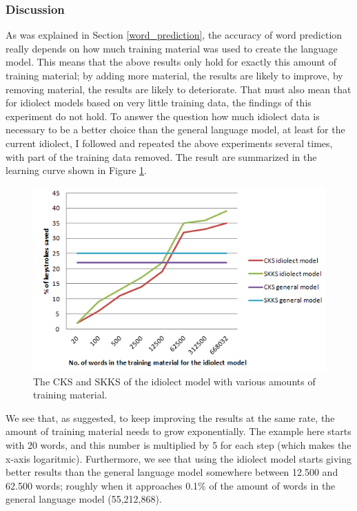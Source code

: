 \documentclass[11pt]{article}
\begin{document}
\subsubsection{Discussion}
As was explained in Section \ref{word_prediction}, the accuracy of word prediction really depends on how much training material was used to create the language model. This means that the above results only hold for exactly this amount of training material; by adding more material, the results are likely to improve, by removing material, the results are likely to deteriorate. That must also mean that for idiolect models based on very little training data, the findings of this experiment do not hold. To answer the question how much idiolect data is necessary to be a better choice than the general language model, at least for the current idiolect, I followed  and repeated the above experiments several times, with part of the training data removed. The result are summarized in the learning curve shown in Figure \ref{lcurve}.

\begin{figure}[H] \centering
\includegraphics[scale=1]{lcurve}
\caption{The CKS and SKKS of the idiolect model with various amounts of training material.}
\label{lcurve}
\end{figure} 

We see that, as  suggested, to keep improving the results at the same rate, the amount of training material needs to grow exponentially. The example here starts with 20 words, and this number is multiplied by 5 for each step (which makes the x-axis logaritmic). Furthermore, we see that using the idiolect model starts giving better results  than the general language model somewhere between 12.500 and 62.500 words; roughly when it approaches 0.1\% of the amount of words in the general language model (55,212,868).
\end{document}
